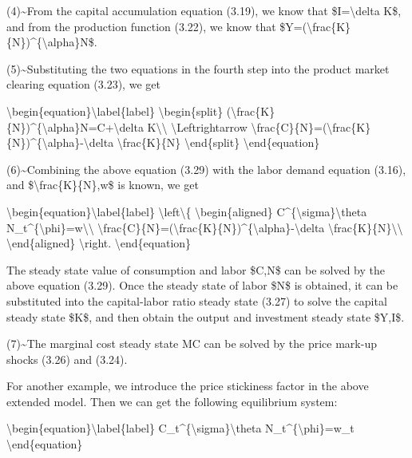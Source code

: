 \documentclass[10pt,math=newtx,citestyle=gb7714-2015,bibstyle=gb7714-2015]{elegantbook}
\begin{document}
	(4)\~{}From the capital accumulation equation (3.19), we know that \$I=\textbackslash{}delta K\$, and from the production function (3.22), we know that \$Y=(\textbackslash{}frac\{K\}\{N\})\^{}\{\textbackslash{}alpha\}N\$.
	
	(5)\~{}Substituting the two equations in the fourth step into the product market clearing equation (3.23), we get
	
	\textbackslash{}begin\{equation\}\textbackslash{}label\{label\}
	\textbackslash{}begin\{split\}
	(\textbackslash{}frac\{K\}\{N\})\^{}\{\textbackslash{}alpha\}N=C+\textbackslash{}delta K\textbackslash{}\textbackslash{}
	\textbackslash{}Leftrightarrow \textbackslash{}frac\{C\}\{N\}=(\textbackslash{}frac\{K\}\{N\})\^{}\{\textbackslash{}alpha\}-\textbackslash{}delta \textbackslash{}frac\{K\}\{N\}
	\textbackslash{}end\{split\}
	\textbackslash{}end\{equation\}
	
	(6)\~{}Combining the above equation (3.29) with the labor demand equation (3.16), and \$\textbackslash{}frac\{K\}\{N\},w\$ is known, we get
	
	\textbackslash{}begin\{equation\}\textbackslash{}label\{label\}
	\textbackslash{}left\textbackslash{}\{
	\textbackslash{}begin\{aligned\}
	C\^{}\{\textbackslash{}sigma\}\textbackslash{}theta N\_t\^{}\{\textbackslash{}phi\}=w\textbackslash{}\textbackslash{}
	\textbackslash{}frac\{C\}\{N\}=(\textbackslash{}frac\{K\}\{N\})\^{}\{\textbackslash{}alpha\}-\textbackslash{}delta \textbackslash{}frac\{K\}\{N\}\textbackslash{}\textbackslash{}
	\textbackslash{}end\{aligned\}
	\textbackslash{}right.
	\textbackslash{}end\{equation\}
	
	The steady state value of consumption and labor \$C,N\$ can be solved by the above equation (3.29). Once the steady state of labor \$N\$ is obtained, it can be substituted into the capital-labor ratio steady state (3.27) to solve the capital steady state \$K\$, and then obtain the output and investment steady state \$Y,I\$.
	
	(7)\~{}The marginal cost steady state MC can be solved by the price mark-up shocks (3.26) and (3.24).
	
	
	For another example, we introduce the price stickiness factor in the above extended model. Then we can get the following equilibrium system:
	
	\textbackslash{}begin\{equation\}\textbackslash{}label\{label\}
	C\_t\^{}\{\textbackslash{}sigma\}\textbackslash{}theta N\_t\^{}\{\textbackslash{}phi\}=w\_t
	\textbackslash{}end\{equation\}
	
\end{document}
